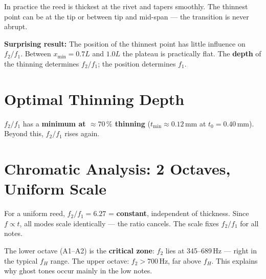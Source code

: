 \documentclass[11pt,a4paper]{article}
\begin{document}
In practice the reed is thickest at the rivet and tapers smoothly.
The thinnest point can be at the tip or between tip and mid-span ---
the transition is never abrupt.

\textbf{Surprising result:} The position of the thinnest point has little
influence on $f_2/f_1$. Between $x_\mathrm{min} = 0{.}7L$ and $1{.}0L$ the
plateau is practically flat. The \textbf{depth} of the thinning determines
$f_2/f_1$; the position determines $f_1$.

\section{Optimal Thinning Depth}

$f_2/f_1$ has a \textbf{minimum at $\approx 70\,\%$ thinning}
($t_\mathrm{min} \approx 0{.}12$\,mm at $t_0 = 0{.}40$\,mm). Beyond this,
$f_2/f_1$ rises again.

\begin{center}
\end{center}

\section{Chromatic Analysis: 2 Octaves, Uniform Scale}

For a uniform reed, $f_2/f_1 = 6{.}27$ = \textbf{constant},
independent of thickness. Since $f \propto t$, all modes scale identically ---
the ratio cancels. The scale fixes $f_2/f_1$ for all notes.

The lower octave (A1--A2) is the \textbf{critical zone}: $f_2$ lies at
345--689\,Hz --- right in the typical $f_H$ range. The upper octave: $f_2 > 700$\,Hz,
far above $f_H$. This explains why ghost tones occur mainly in the low notes.
\end{document}
